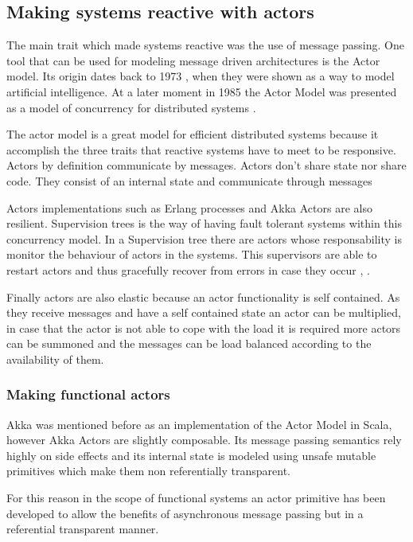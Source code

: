 \documentclass[../main.tex]{subfiles}
\begin{document}
\subsection{Making systems reactive with actors}
The main trait which made systems reactive was the use of message passing. One
tool that can be used for modeling message driven architectures is the Actor
model. Its origin dates back to  1973 \autocite{HewittAFormalism}, when they were shown as a way to
model artificial intelligence. At a later moment in 1985 the Actor Model was
presented as a model of concurrency for distributed systems \autocite{Agha1985ACTORS:Systems}.

The
actor model is a great model for efficient distributed systems because it
accomplish the three traits that reactive systems have to meet to be responsive.
Actors by definition communicate by messages. Actors don't share state nor share
code. They consist of an internal state and communicate through messages

Actors implementations such as Erlang processes and Akka Actors are also resilient.
Supervision trees is the way of having fault tolerant systems within this
concurrency model. In a Supervision tree there are actors whose responsability
is monitor the behaviour of actors in the systems. This supervisors are able to
restart actors and thus gracefully recover from errors in case they occur
\autocite{ErlangBehaviour}, \autocite{SupervisionDocumentation}.

Finally actors are also elastic because an actor functionality is self
contained. As they receive messages and have a self contained state an actor can be
multiplied, in case that the actor is not able to cope with the load it is
required more actors can be summoned and the messages can be load balanced
according to the availability of them.

\subsubsection{Making functional actors}
Akka was mentioned before as an implementation of the Actor Model in Scala,
however Akka Actors are slightly composable. Its message passing semantics rely
highly on side effects and its internal state is modeled using unsafe mutable
primitives which make them non referentially transparent.

For this reason in the scope of functional systems an actor primitive has been
developed to allow the benefits of asynchronous message passing but in a
referential transparent manner.
\end{document}
